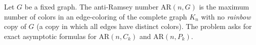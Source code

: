 Let $G$ be a fixed graph.
The anti-Ramsey number $\mathrm{AR}(n,G)$ is the maximum number of colors in an edge-coloring of the complete graph $K_n$ with no \emph{rainbow} copy of $G$ (a copy in which all edges have distinct colors).
The problem asks for exact asymptotic formulas for $\mathrm{AR}(n,C_k)$ and $\mathrm{AR}(n,P_k)$.
